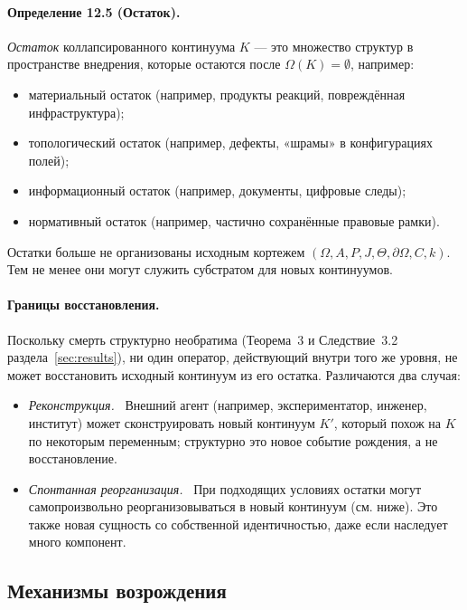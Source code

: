 \paragraph{Определение 12.5 (Остаток).}
\emph{Остаток} коллапсированного континуума \(K\) — это множество
структур в пространстве внедрения, которые остаются после
\(\Omega(K)=\emptyset\), например:
\begin{itemize}
  \item материальный остаток (например, продукты реакций, повреждённая
        инфраструктура);
  \item топологический остаток (например, дефекты, «шрамы» в конфигурациях
        полей);
  \item информационный остаток (например, документы, цифровые следы);
  \item нормативный остаток (например, частично сохранённые правовые рамки).
\end{itemize}

Остатки больше не организованы исходным кортежем
\((\Omega,A,P,J,\Theta,\partial\Omega,C,k)\). Тем не менее они могут
служить субстратом для новых континуумов.

\paragraph{Границы восстановления.}
Поскольку смерть структурно необратима
(Теорема~3 и Следствие~3.2 раздела~\ref{sec:results}), ни один оператор,
действующий внутри того же уровня, не может восстановить исходный континуум
из его остатка. Различаются два случая:
\begin{itemize}
  \item \emph{Реконструкция.} \
        Внешний агент (например, экспериментатор, инженер, институт) может
        сконструировать новый континуум \(K'\), который похож на \(K\) по
        некоторым переменным; структурно это новое событие рождения, а не
        восстановление.
  \item \emph{Спонтанная реорганизация.} \
        При подходящих условиях остатки могут самопроизвольно реорганизовываться
        в новый континуум (см. ниже). Это также новая сущность со собственной
        идентичностью, даже если наследует много компонент.
\end{itemize}

\subsection{Механизмы возрождения}

